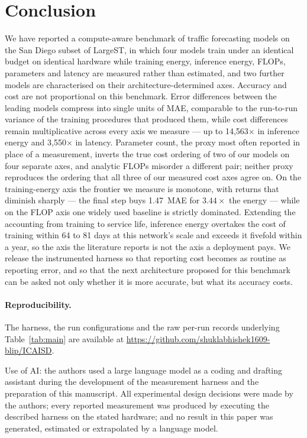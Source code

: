 \documentclass[manuscript,screen,review]{acmart}
\begin{document}
\section{Conclusion}
We have reported a compute-aware benchmark of traffic forecasting models on
the San Diego subset of LargeST, in which four models train under an
identical budget on identical hardware while training energy, inference
energy, FLOPs, parameters and latency are measured rather than estimated, and
two further models are characterised on their architecture-determined axes.
Accuracy and cost are not proportional on this benchmark. Error differences
between the leading models compress into single units of MAE, comparable to
the run-to-run variance of the training procedures that produced them, while
cost differences remain multiplicative across every axis we measure --- up to
14,563$\times$ in inference energy and 3,550$\times$ in latency. Parameter
count, the proxy most often reported in place of a measurement, inverts the
true cost ordering of two of our models on four separate axes, and analytic
FLOPs misorder a different pair; neither proxy reproduces the ordering that
all three of our measured cost axes agree on. On the training-energy axis the
frontier we measure is monotone, with returns that diminish sharply --- the
final step buys 1.47~MAE for $3.44\times$ the energy --- while on the FLOP
axis one widely used baseline is strictly dominated. Extending the accounting
from training to service life, inference energy overtakes the cost of training
within 64 to 81 days at this network's scale and exceeds it fivefold within a
year, so the axis the literature reports is not the axis a deployment pays.
We release the instrumented harness so that reporting cost becomes as
routine as reporting error, and so that the next architecture proposed for
this benchmark can be asked not only whether it is more accurate, but what its
accuracy costs.

\paragraph{Reproducibility.} The harness, the run configurations and the raw
per-run records underlying Table~\ref{tab:main} are available at
\url{https://github.com/shuklabhishek1609-blip/ICAISD}.

\begin{acks}
Use of AI: the authors used a large language model as a coding and drafting
assistant during the development of the measurement harness and the
preparation of this manuscript. All experimental design decisions were made
by the authors; every reported measurement was produced by executing the
described harness on the stated hardware; and no result in this paper was
generated, estimated or extrapolated by a language model.
\end{acks}



\end{document}
